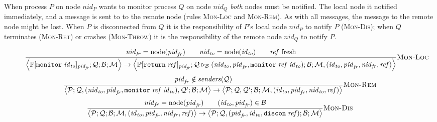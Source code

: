 \documentclass{article}
\newcommand{\sReturn}{\mathtt{return}}
\newcommand{\sMonitor}{\mathtt{monitor}}
\DeclareMathOperator{\sNodeOf}{node}
\newcommand{\sExtend}[1]{\mathrel{\triangleright_{#1}}}
\newcommand{\sNid}{\ensuremath{\mathit{nid}}}
\newcommand{\sPid}{\ensuremath{\mathit{pid}}}
\newcommand{\sId}{\ensuremath{\mathit{id}}}
\newcommand{\sRef}{\ensuremath{\mathit{ref}}}
\newcommand{\sSystem}[4]{\left\langle #1 ; #2 ; #3 ; #4 \right\rangle}
\newcommand{\sQueue}{\mathcal{Q}}
\newcommand{\sProcesses}{\mathcal{P}}
\newcommand{\sBlacklist}{\mathcal{B}}
\newcommand{\sMonitors}{\mathcal{M}}
\newcommand{\sCtxt}[1]{\mathbb{#1}}
\newcommand{\sSenders}{\mathit{senders}}
\begin{document}
When process $P$ on node $\sNid_P$ wants to monitor process $Q$ on node
$\sNid_Q$ \emph{both} nodes must be notified. The local node it notified
immediately, and a message is sent to to the remote node (rules
\textsc{Mon-Loc} and \textsc{Mon-Rem}). As with all messages, the
message to the remote node might be lost. When $P$ is disconnected from $Q$ it
is the responsibility of $P$'s local node $\sNid_P$ to notify $P$
(\textsc{Mon-Dis}); when $Q$ terminates (\textsc{Mon-Ret}) or crashes
(\textsc{Mon-Throw}) it is the responsibility of the remote node $\sNid_Q$ to
notify $P$. 

\begin{figure}
\small
\begin{equation*}
\frac{
  \sNid_\mathit{fr} = \sNodeOf(\sPid_\mathit{fr}) 
\qquad
  \sNid_\mathit{to} = \sNodeOf(\sId_\mathit{to})
\qquad
  \sRef \text{ fresh}
}{
\sSystem{\sCtxt{P}[ \sMonitor \; \sId_\mathit{to} ]_{\sPid_\mathit{fr}}}
          {\sQueue}
          {\sBlacklist}
          {\sMonitors}
\rightarrow
  \sSystem{\sCtxt{P}[ \sReturn \; \sRef ]_{\sPid_\mathit{fr}}}
          {\sQueue \sExtend{\sBlacklist} (\sNid_\mathit{to}, \sPid_\mathit{fr}, \sMonitor \; \sRef \; \sId_\mathit{to})}
          {\sBlacklist}
          {\sMonitors, (\sId_\mathit{to}, \sPid_\mathit{fr}, \sNid_\mathit{fr}, \sRef)}
} \textsc{Mon-Loc}
\end{equation*}
%
\begin{equation*}
\frac{
  \sPid_\mathit{fr} \notin \sSenders(\sQueue)
}{
  \sSystem{\sProcesses}
          {\sQueue, (\sNid_\mathit{to}, \sPid_\mathit{fr}, \sMonitor \; \sRef \; \sId_\mathit{to}), \sQueue'}
          {\sBlacklist}
          {\sMonitors}
\rightarrow          
  \sSystem{\sProcesses}
          {\sQueue, \sQueue'}
          {\sBlacklist}
          {\sMonitors, (\sId_\mathit{to}, \sPid_\mathit{fr}, \sNid_\mathit{to}, \sRef)}
} \textsc{Mon-Rem}
\end{equation*}
%
\begin{equation*}
\frac{
  \sNid_\mathit{fr} = \sNodeOf(\sPid_\mathit{fr})
\qquad
  (\sId_\mathit{to}, \sPid_\mathit{fr}) \in \sBlacklist
}{
  \sSystem{\sProcesses}
          {\sQueue}
          {\sBlacklist}
          {\sMonitors, (\sId_\mathit{to}, \sPid_\mathit{fr}, \sNid_\mathit{fr}, \sRef)}
\rightarrow          
  \sSystem{\sProcesses}
          {\sQueue, (\sPid_\mathit{fr}, \sId_\mathit{to}, \mathtt{discon} \; \sRef)}
          {\sBlacklist}
          {\sMonitors}
} \textsc{Mon-Dis}
\end{equation*}
%
\begin{equation*}

\end{equation*}
\end{figure}
\end{document}
